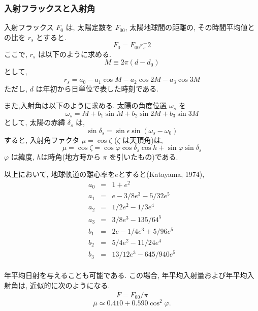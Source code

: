 \subsubsection{入射フラックスと入射角 }

入射フラックス $F_0$ は,
太陽定数を $F_{00}$, 
太陽地球間の距離の, 
その時間平均値との比を $r_s$ とすると.
%
\begin{equation}
F_0 = F_00 r_s^-2 
\end{equation}
ここで, $r_s$ は以下のように求める.
%
\begin{equation}
  M \equiv 2 \pi ( d - d_0 ) 
\end{equation}
として,
\begin{equation}
  r_s = a_0 - a_1 \cos M - a_2 \cos 2M - a_3 \cos 3M
\end{equation}
ただし, $d$ は年初から日単位で表した時刻である.

また,入射角は以下のように求める.
太陽の角度位置 $\omega_s$ を
\begin{equation}
  \omega_s = M + b_1 \sin M + b_2 \sin 2M + b_3 \sin 3M
\end{equation}
として,  太陽の赤緯 $\delta_s$ は,
\begin{equation}
  \sin \delta_s = \sin \epsilon \sin ( \omega_s - \omega_0 ) 
\end{equation}
%
すると, 入射角ファクタ $\mu = \cos \zeta$ ($\zeta$ は天頂角)は,
\begin{equation}
\mu = \cos \zeta = \cos \varphi \cos \delta_s \cos h
                 + \sin \varphi \sin \delta_s
\end{equation}
$\varphi$ は緯度,
$h$は時角(地方時から $\pi$ を引いたもの)である.

以上において, 地球軌道の離心率を$e$とすると(Katayama, 1974),
\begin{eqnarray}
   a_0 & = &  1 + e^2 \\
   a_1 & = &  e - 3/8 e^3 - 5/32 e^5 \\
   a_2 & = &  1/2 e^2 - 1/3e^4 \\
   a_3 & = &  3/8 e^3 - 135/64^5 \\
   b_1 & = & 2e - 1/4 e^3 + 5/96 e^5 \\
   b_2 & = & 5/4 e^2 - 11/24 e^4 \\
   b_3 & = & 13/12 e^3 - 645/940 e^5 \\
\end{eqnarray}

年平均日射を与えることも可能である.
この場合, 年平均入射量および年平均入射角は, 
近似的に次のようになる.
%
\begin{equation}
\overline{F} = F_{00}/\pi
\end{equation}
%
\begin{equation}
\overline{\mu} \simeq 0.410 + 0.590 \cos^2 \varphi .
\end{equation}

